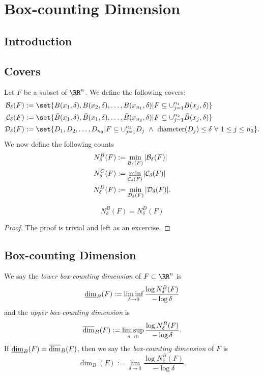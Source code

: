 
\chapter{Box-counting Dimension}

\section{Introduction}

\section{Covers}

Let $F$ be a subset of $\RR^n$.
We define the following covers:
\begin{align*}
	\mcb_\delta(F)&:=\set{B(x_1,\delta),B(x_2,\delta),\ldots,B(x_{n_1},\delta)| F\subseteq \cup_{j=1}^{n_1} B(x_j,\delta)}\\
	\mcc_\delta(F)&:=\set{\bar{B}(x_1,\delta),\bar{B}(x_1,\delta),\ldots,\bar{B}(x_{n_2},\delta)| F\subseteq \cup_{j=1}^{n_2} \bar{B}(x_j,\delta)}\\
	\mcd_\delta(F)&:=\set{D_1,D_2,\ldots, D_{n_3}| F\subseteq \cup_{j=1}^{n_3} D_j \,\,\wedge\,\, \diam(D_j)\leq\delta\,\, \forall\,\, 1\leq j\leq n_3}.
\end{align*}
We now define the following counts
\begin{align*}
	N^B_\delta(F)&:=\min\limits_{\mathcal{B}_\delta(F)}|\mathcal{B}_\delta(F)|\\
	N^C_\delta(F)&:=\min\limits_{\mathcal{C}_\delta(F)}|\mathcal{C}_\delta(F)|\\
	N^D_\delta(F)&:=\min\limits_{\mathcal{D}_\delta(F)}|\mathcal{D}_\delta(F)|.
\end{align*}

\begin{thm}
	\[
		N^B_\delta(F)=N^D_\delta(F)
	\]
\end{thm}
\begin{proof}
	The proof is trivial and left as an excercise.
\end{proof}

\section{Box-counting Dimension}

\begin{definition}
	We say the \textit{lower box-counting dimension} of $F\subset\RR^n$ is
	\[
		\underline{\operatorname{dim}}_B(F):=\liminf\limits_{\delta\rightarrow 0} \frac{\log N^B_\delta(F)}{-\log\delta}
	\]
	and the \textit{upper box-counting dimension} is
	\[
		\overline{\operatorname{dim}}_B(F):=\limsup\limits_{\delta\rightarrow 0} \frac{\log N^B_\delta(F)}{-\log\delta}.
	\]
	If $\underline{\operatorname{dim}}_B(F)=\overline{\operatorname{dim}}_B(F)$, then we say the \textit{box-counting dimension} of $F$ is
	\[
		\dim_B(F):=\lim\limits_{\delta\rightarrow 0} \frac{\log N^B_\delta(F)}{-\log\delta}.
	\]
\end{definition}

